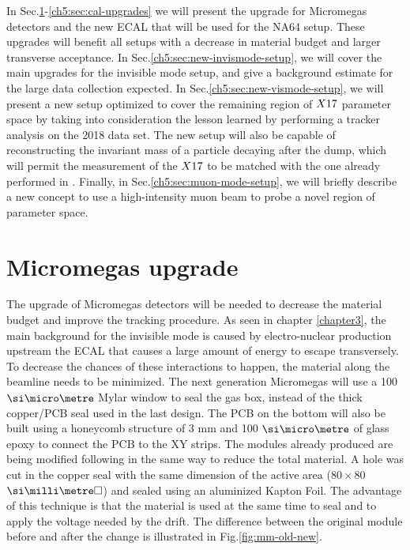 In Sec.\ref{ch5:sec:mm-upgrades}-\ref{ch5:sec:cal-upgrades} we will present the upgrade for Micromegas detectors and the new ECAL that will be used for the NA64 setup. These upgrades will benefit all setups with a decrease in material budget and larger transverse acceptance. In Sec.\ref{ch5:sec:new-invismode-setup}, we will cover the main upgrades for the invisible mode setup, and give a background estimate for the large data collection expected. In Sec.\ref{ch5:sec:new-vismode-setup}, we will present a new setup optimized to cover the remaining region of $X17$ parameter space by taking into consideration the lesson learned by performing a tracker analysis on the 2018 data set. The new setup will also be capable of reconstructing the invariant mass of a particle decaying after the dump, which will permit the measurement of the $X17$ to be matched with the one already performed in \cite{Krasznahorkay:2015iga,Krasznahorkay:2019lyl}. Finally, in Sec.\ref{ch5:sec:muon-mode-setup}, we will briefly describe a new concept to use a high-intensity muon beam to probe a novel region of parameter space.

\section{Micromegas upgrade}
\label{ch5:sec:mm-upgrades}

The upgrade of Micromegas detectors will be needed to decrease the material budget and improve the tracking procedure. As seen in chapter \ref{chapter3}, the main background for the invisible mode is caused by electro-nuclear production upstream the ECAL that causes a large amount of energy to escape transversely. To decrease the chances of these interactions to happen, the material along the beamline needs to be minimized. The next generation Micromegas will use a 100 $\mum$ Mylar window to seal the gas box, instead of the thick copper/PCB seal used in the last design. The PCB on the bottom will also be built using a honeycomb structure of 3 mm and 100 $\mum$ of glass epoxy to connect the PCB to the XY strips. The modules already produced are being modified following in the same way to reduce the total material. A hole was cut in the copper seal with the same dimension of the active area ($80 \times 80$ $\mms$) and sealed using an aluminized Kapton Foil. The advantage of this technique is that the material is used at the same time to seal and to apply the voltage needed by the drift. The difference between the original module before and after the change is illustrated in Fig.\ref{fig:mm-old-new}.

